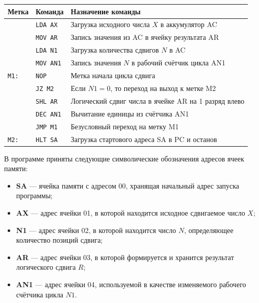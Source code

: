\documentclass[11pt, a4paper]{article}
\begin{document}
\begin{center}
	\begin{tabular}{|l|l|l|}
		\hline
		\textbf{Метка} & \textbf{Команда} & \textbf{Назначение команды}                          \\
		\hline
		               & \texttt{LDA AX}  & Загрузка исходного числа $X$ в аккумулятор AC        \\
		               & \texttt{MOV AR}  & Запись значения из AC в ячейку результата AR         \\
		               & \texttt{LDA N1}  & Загрузка количества сдвигов $N$ в AC                 \\
		               & \texttt{MOV AN1} & Запись значения $N$ в рабочий счётчик цикла AN1      \\
		\texttt{M1:}   & \texttt{NOP}     & Метка начала цикла сдвига                            \\
		               & \texttt{JZ M2}   & Если $N1 = 0$, то переход на выход к метке M2        \\
		               & \texttt{SHL AR}  & Логический сдвиг числа в ячейке AR на 1 разряд влево \\
		               & \texttt{DEC AN1} & Вычитание единицы из счётчика AN1                    \\
		               & \texttt{JMP M1}  & Безусловный переход на метку M1                      \\
		\texttt{M2:}   & \texttt{HLT SA}  & Загрузка стартового адреса SA в PC и останов         \\
		\hline
	\end{tabular}
\end{center}

В программе приняты следующие символические обозначения адресов ячеек памяти:
\begin{itemize}
	\item \textbf{SA} --- ячейка памяти с адресом 00, хранящая начальный адрес запуска программы;
	\item \textbf{AX} --- адрес ячейки 01, в которой находится исходное сдвигаемое число $X$;
	\item \textbf{N1} --- адрес ячейки 02, в которой находится число $N$, определяющее количество позиций сдвига;
	\item \textbf{AR} --- адрес ячейки 03, в которой формируется и хранится результат логического сдвига $R$;
	\item \textbf{AN1} --- адрес ячейки 04, используемой в качестве изменяемого рабочего счётчика цикла $N1$.
\end{itemize}
\end{document}

